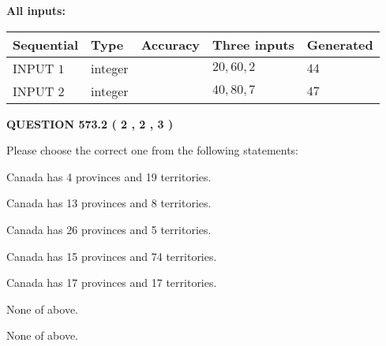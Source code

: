 \documentclass[12pt]{article}
\begin{document}
   
   
   
\noindent{}
   
   
   
   
\noindent\vspace{0.1in}\hspace{-0.08in} {\textbf{\Large{All inputs: }}}
   
   
  
  
\noindent\begin{tabular}{|l|l|l|l|l|}
\hline
 Sequential & Type & Accuracy & Three inputs & Generated \\ 
\hline
 
 
  INPUT $  1 $ & integer &  & $
 20
 , 
 60
 , 
 2
 $ & $ 44 $ 
 \\  \hline  
 
 
  INPUT $  2 $ & integer &  & $
 40
 , 
 80
 , 
 7
 $ & $ 47 $ 
 \\  \hline  
 \end{tabular}
   
   
  
\vspace{0.2in}
  
{\textbf{\Large{QUESTION
573.2 
 ( 2 , 2 , 3 )
}}}
  
  
Please choose the correct one from the following statements:
 
 
Canada has   4 provinces and  19 territories.
 
 
Canada has  13 provinces and  8 territories.
 
 
Canada has  26 provinces and  5 territories.
 
 
Canada has  15 provinces and  74 territories.
 
 
Canada has  17 provinces and  17 territories.
 
 
 None of above.
 
 
\noindent{}
 
 
 None of above.
 
 
\noindent{}
 
 
   
   
   
\end{document}
